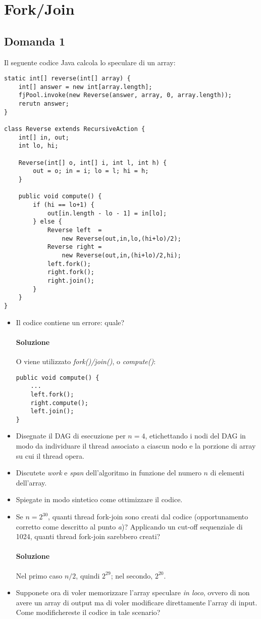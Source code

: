 \newpage

\section{Fork/Join}

\subsection{Domanda 1}
Il seguente codice Java calcola lo speculare di un array:
\begin{lstlisting}
static int[] reverse(int[] array) {
	int[] answer = new int[array.length];
	fjPool.invoke(new Reverse(answer, array, 0, array.length));
	rerutn answer;
}

class Reverse extends RecursiveAction {
	int[] in, out;
	int lo, hi;

	Reverse(int[] o, int[] i, int l, int h) {
		out = o; in = i; lo = l; hi = h;
	}

	public void compute() {
		if (hi == lo+1) {
			out[in.length - lo - 1] = in[lo];
		} else {
			Reverse left  =
				new Reverse(out,in,lo,(hi+lo)/2);
			Reverse right =
				new Reverse(out,in,(hi+lo)/2,hi);
			left.fork();
			right.fork();
			right.join();
		}
	}
}
\end{lstlisting}
\begin{itemize}
	\item Il codice contiene un errore: quale?
	\paragraph{Soluzione}
	O viene utilizzato \textit{fork()/join()}, o \textit{compute()}:
	\begin{lstlisting}
public void compute() {
	...
	left.fork();
	right.compute();
	left.join();
}
	\end{lstlisting}
	\item Disegnate il DAG di esecuzione per $n = 4$, etichettando i nodi del DAG in modo da individuare il thread associato a ciascun nodo e la porzione di array su cui il thread opera.
	\item Discutete \textit{work} e \textit{span} dell'algoritmo in funzione del numero $n$ di elementi dell'array.
	\item Spiegate in modo sintetico come ottimizzare il codice.
	\item Se $n = 2^{30}$, quanti thread fork-join sono creati dal codice (opportunamento corretto come descritto al punto \textit{a})? Applicando un cut-off sequenziale di 1024, quanti thread fork-join sarebbero creati?\\
	\paragraph{Soluzione}
	Nel primo caso $n/2$, quindi $2^{29}$; nel secondo, $2^{20}$.
	\item Supponete ora di voler memorizzare l'array speculare \textit{in loco}, ovvero di non avere un array di output ma di voler modificare direttamente l'array di input. Come modifichereste il codice in tale scenario?
\end{itemize}


